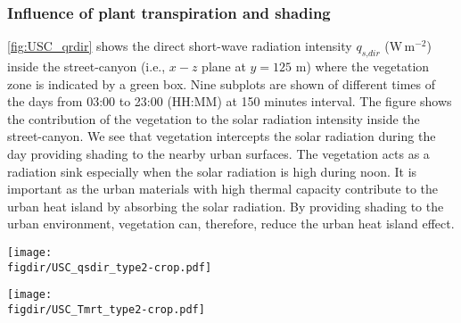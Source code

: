 \subsubsection*{Influence of plant transpiration and shading}

\cref{fig:USC_qrdir} shows the direct short-wave radiation intensity $q_{\textit{s,dir}}$ (W\,m$^{-2}$) inside the street-canyon (i.e., $x-z$ plane at $y=125$ m) where the vegetation zone is indicated by a green box. Nine subplots are shown of different times of the days from 03:00 to 23:00 (HH:MM) at 150 minutes interval. The figure shows the contribution of the vegetation to the solar radiation intensity inside the street-canyon. We see that vegetation intercepts the solar radiation during the day providing shading to the nearby urban surfaces. The vegetation acts as a radiation sink especially when the solar radiation is high during noon. It is important as the urban materials with high thermal capacity contribute to the urban heat island by absorbing the solar radiation. By providing shading to the urban environment, vegetation can, therefore, reduce the urban heat island effect.  

\begin{sidewaysfigure}[p]
	\centering
	\texttt{[image: \\figdir/USC\_qsdir\_type2-crop.pdf]}
	\caption{Direct short-wave radiation intensity $|q_{\textit{s,dir}}|$ (W\,m$^{-2}$) inside the street-canyon where the vegetation zone is indicated by a green box. The plot shows the fields with a 150 minutes interval from 03:00 to 23:00 (HH:MM).}
	\label{fig:USC_qrdir}
\end{sidewaysfigure}

\begin{sidewaysfigure}[p]
	\centering
	\texttt{[image: \\figdir/USC\_Tmrt\_type2-crop.pdf]}
	\caption{Mean radiant temperature $T_{\textit{mrt}}$  ($^{\circ}$C) inside the street-canyon where the vegetation zone is indicated by a green box. The plot shows the fields with a 150 minutes interval from 03:00 to 23:00 (HH:MM).}
	\label{fig:USC_Tmrt}
\end{sidewaysfigure}



